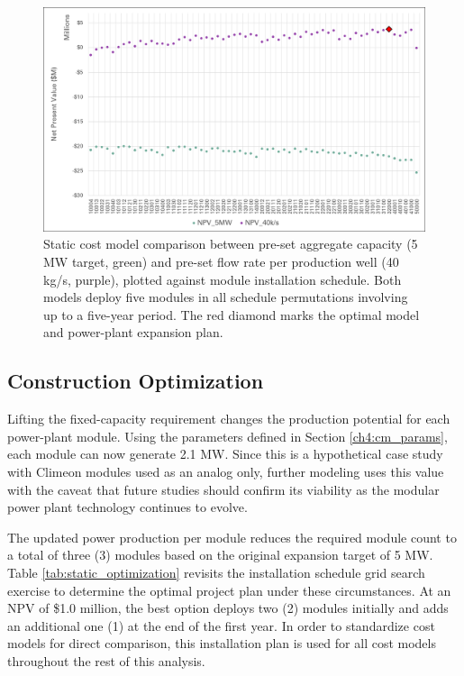 \begin{figure}[!htp]
\centering
\includegraphics[width=.98\textwidth]
{templates/images/Figure-Static_Model_Construction.png}
\caption[Static cost-model comparison]{Static cost model comparison between pre-set aggregate capacity (5 MW target, green) and pre-set flow rate per production well (40 kg/s, purple), plotted against module installation schedule. Both models deploy five modules in all schedule permutations involving up to a five-year period. The red diamond marks the optimal model and power-plant expansion plan.}
\label{fig:static_model_compare}
\end{figure}

\subsection{Construction Optimization}\label{ch6:static_schedule}

Lifting the fixed-capacity requirement changes the production potential for each power-plant module. Using the parameters defined in Section \ref{ch4:cm_params}, each module can now generate 2.1 MW. Since this is a hypothetical case study with Climeon modules used as an analog only, further modeling uses this value with the caveat that future studies should confirm its viability as the modular power plant technology continues to evolve.

The updated power production per module reduces the required module count to a total of three (3) modules based on the original expansion target of 5 MW. Table \ref{tab:static_optimization} revisits the installation schedule grid search exercise to determine the optimal project plan under these circumstances. At an NPV of \$1.0 million, the best option deploys two (2) modules initially and adds an additional one (1) at the end of the first year. In order to standardize cost models for direct comparison, this installation plan is used for all cost models throughout the rest of this analysis.

